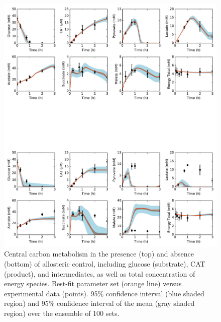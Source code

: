 \documentclass[12pt]{article}
\begin{document}
\begin{figure}[ht]
\centering
\includegraphics[width=1.00\textwidth]{./Figures/CarbonBoth.pdf}
\caption{Central carbon metabolism in the presence (top) and absence (bottom) of allosteric control, including glucose (substrate), CAT (product), and intermediates, as well as total concentration of energy species. Best-fit parameter set (orange line) versus experimental data (points). 95\% confidence interval (blue shaded region) and 95\% confidence interval of the mean (gray shaded region) over the ensemble of 100 sets.}
\label{fig:CarbonBoth}
\end{figure}
\end{document}
